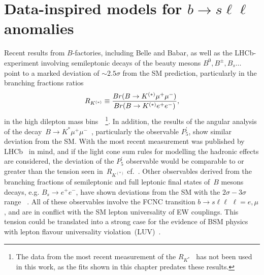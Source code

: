
\chapter{Data-inspired models for $b \to s \ell \ell$ anomalies}\label{chap:flav}
\par Recent results from $B$-factories, including Belle and Babar, as well as the LHCb-experiment involving semileptonic decays of the beauty mesons $B^0, B^\pm, B_s \dots$ point to a marked deviation of $ \sim 2.5 \sigma$ from the SM prediction, particularly in the branching fractions ratios
\begin{equation}
	R_{K^{(*)}} \equiv {Br(B \to K^{(*)} \mu^{+} \mu^{-}) \over Br(B \to K^{(*)} e^{+} e^{-})},
\end{equation}
in the high dilepton mass bins~\cite{Aaij:2014ora,Aaij:2017vbb,Aaij:2019wad,Abdesselam:2019wac,LHCb:2021trn}~\footnote{The data from the most recent measurement of the $R_{K^*}$~\cite{LHCb:2021trn} has not been used in this work, as the fits shown in this chapter predates these results.}. In addition, the results of the angular analysis of the decay~$B \to K^{*} \mu^{+} \mu^{-}$~\cite{Descotes-Genon:2013wba,Descotes-Genon:2015uva}, particularly the observable $P_5^\prime$,  show similar deviation from the SM. With the most recent measurement was published by LHCb~\cite{LHCb:2020lmf} in mind, and if the light cone sum rules for modelling the hadronic effects are considered, the deviation of the $P_5^\prime$ observable would be comparable to or greater than the tension seen in~$R_{K^{(*)}}$ cf.~\cite{Ciuchini:2018anp,Hurth:2020rzx}. Other observables derived from the branching fractions of semileptonic and full leptonic final states of~$B$ mesons decays, e.g. $ B_{s} \to e^{+} e^{-}$, have shown deviations from the SM with the $2\sigma-3\sigma$ range ~\cite{Chatrchyan:2013bka,Aaij:2017vad,Aaboud:2018mst,Aaij:2020nol}. All of these observables involve
 the FCNC transition $ b \to s \ell \ell\, \, \ell = e, \mu$, and are in conflict with the SM lepton universality of EW couplings. This tension could be translated into a strong case for the evidence of BSM physics with lepton flavour universality violation~(LUV)~\cite{Hiller:2014yaa,Hiller:2014ula,Bordone:2016gaq}.
